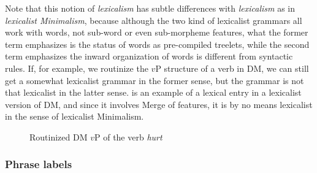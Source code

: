 \documentclass[../main.tex]{subfiles}
\begin{document}
Note that this notion of 
\emph{lexicalism} has subtle differences with \emph{lexicalism} as in \emph{lexicalist Minimalism}, 
because although the two kind of lexicalist grammars all work with words, not sub-word or even 
sub-morpheme features, what the former term emphasizes is the status of words as pre-compiled
treelets, while the second term emphasizes the inward organization of words is different from 
syntactic rules. If, for example, we routinize the $v$P structure of a verb in DM, we can still get a somewhat 
lexicalist grammar in the former sense, but the grammar is not that lexicalist in the latter sense.
 is an example of a lexical entry in a lexicalist version of DM, 
and since it involves Merge of features, it is by no means lexicalist in the sense of lexicalist Minimalism.

\begin{figure}
    \centering
    
    \caption{Routinized DM $v$P of the verb \emph{hurt}}
    \label{fig:hurt-dm-routine}
\end{figure}


\subsubsection{Phrase labels}\label{sec:phrase-label}
\end{document}
